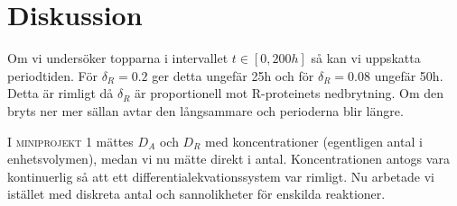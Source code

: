 \section{Diskussion}
\label{sec:diskussion}

Om vi undersöker topparna i intervallet $t \in [0, 200h]$ så kan vi uppskatta periodtiden. För $\delta_R = 0.2$ ger detta ungefär 25h och för $\delta_R = 0.08$ ungefär 50h. Detta är rimligt då $\delta_R$ är proportionell mot R-proteinets nedbrytning. Om den bryts ner mer sällan avtar den långsammare och perioderna blir längre.

I \textsc{miniprojekt 1} mättes $D_A$ och $D_R$ med koncentrationer (egentligen antal i enhetsvolymen), medan vi nu mätte direkt i antal. Koncentrationen antogs vara kontinuerlig så att ett differentialekvationssystem var rimligt. Nu arbetade vi istället med diskreta antal och sannolikheter för enskilda reaktioner.